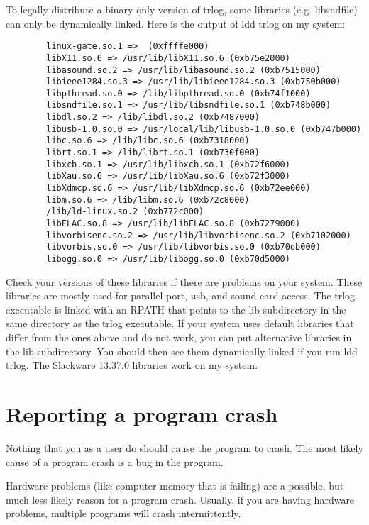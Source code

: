 \documentclass[12pt]{article}
\begin{document}
To legally distribute a binary only version of trlog, some libraries
(e.g. libsndfile) can only be dynamically linked. Here is the output
of ldd trlog on my system:
\begin{verbatim}
        linux-gate.so.1 =>  (0xffffe000)
        libX11.so.6 => /usr/lib/libX11.so.6 (0xb75e2000)
        libasound.so.2 => /usr/lib/libasound.so.2 (0xb7515000)
        libieee1284.so.3 => /usr/lib/libieee1284.so.3 (0xb750b000)
        libpthread.so.0 => /lib/libpthread.so.0 (0xb74f1000)
        libsndfile.so.1 => /usr/lib/libsndfile.so.1 (0xb748b000)
        libdl.so.2 => /lib/libdl.so.2 (0xb7487000)
        libusb-1.0.so.0 => /usr/local/lib/libusb-1.0.so.0 (0xb747b000)
        libc.so.6 => /lib/libc.so.6 (0xb7318000)
        librt.so.1 => /lib/librt.so.1 (0xb730f000)
        libxcb.so.1 => /usr/lib/libxcb.so.1 (0xb72f6000)
        libXau.so.6 => /usr/lib/libXau.so.6 (0xb72f3000)
        libXdmcp.so.6 => /usr/lib/libXdmcp.so.6 (0xb72ee000)
        libm.so.6 => /lib/libm.so.6 (0xb72c8000)
        /lib/ld-linux.so.2 (0xb772c000)
        libFLAC.so.8 => /usr/lib/libFLAC.so.8 (0xb7279000)
        libvorbisenc.so.2 => /usr/lib/libvorbisenc.so.2 (0xb7102000)
        libvorbis.so.0 => /usr/lib/libvorbis.so.0 (0xb70db000)
        libogg.so.0 => /usr/lib/libogg.so.0 (0xb70d5000)
\end{verbatim}
Check your versions of these libraries if there are problems on your
system. These libraries are mostly
used for parallel port, usb, and sound card access.
The trlog executable is linked with an RPATH that points
to the lib subdirectory in the same directory as the trlog executable.
If your system uses default libraries that differ from the ones
above and do not work, you can put alternative libraries in the lib
subdirectory. You should then see them dynamically linked
if you run ldd trlog. The Slackware 13.37.0 libraries work on my
system.

\section{Reporting a program crash}
Nothing that you as a user do should cause the program to crash.
The most likely cause of a program crash is a bug in the program.

Hardware problems (like computer memory that is failing) are a possible,
but much
less likely reason for a program crash.
Usually, if you are having hardware problems,
multiple programs will crash intermittently.
\end{document}
